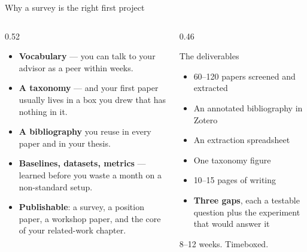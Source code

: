 \documentclass[aspectratio=169,11pt]{beamer}
\newcommand{\key}[1]{\textbf{\color{brand}#1}}
\begin{document}
\begin{frame}{Why a survey is the right first project}
\begin{columns}[T]
\begin{column}{0.52\textwidth}
\begin{itemize}
  \item \key{Vocabulary} --- you can talk to your advisor as a peer within
        weeks.
  \item \key{A taxonomy} --- and your first paper usually lives in a box you
        drew that has nothing in it.
  \item \key{A bibliography} you reuse in every paper and in your thesis.
  \item \key{Baselines, datasets, metrics} --- learned before you waste a
        month on a non-standard setup.
  \item \key{Publishable}: a survey, a position paper, a workshop paper, and
        the core of your related-work chapter.
\end{itemize}
\end{column}
\begin{column}{0.46\textwidth}
\begin{block}{The deliverables}
\footnotesize
\begin{itemize}
  \item 60--120 papers screened and extracted
  \item An annotated bibliography in Zotero
  \item An extraction spreadsheet
  \item One taxonomy figure
  \item 10--15 pages of writing
  \item \key{Three gaps}, each a testable question plus the experiment that
        would answer it
\end{itemize}
\end{block}
\centering\footnotesize 8--12 weeks. Timeboxed.
\end{column}
\end{columns}
\end{frame}
\end{document}
